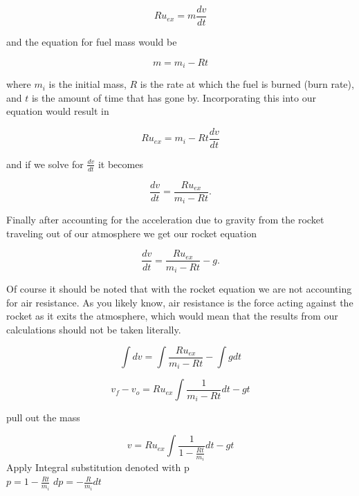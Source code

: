 \documentclass[11pt]{article}
\begin{document}
\begin{equation}
Ru_{ex} = m \frac{dv}{dt}
\end{equation}

\noindent and the equation for fuel mass would be 

\begin{equation}
m = m_i - Rt
\end{equation}

\noindent where $m_i$ is the initial mass, $R$ is the rate at which the fuel is burned (burn rate), and $t$ is the amount of time that has gone by. Incorporating this into our equation would result in

\begin{equation}
Ru_{ex} = m_i - Rt \frac{dv}{dt}
\end{equation}

\noindent and if we solve for $\frac{dv}{dt}$ it becomes

\begin{equation}
\frac{dv}{dt} = \frac{Ru_{ex}}{m_i - Rt}.
\end{equation} 

Finally after accounting for the acceleration due to gravity from the rocket traveling out of our atmosphere we get our rocket equation

\begin{equation}
\frac{dv}{dt} = \frac{Ru_{ex}}{m_i-Rt}-g .
\end{equation}

Of course it should be noted that with the rocket equation we are not accounting for air resistance. As you likely know, air resistance is the force acting against the rocket as it exits the atmosphere, which would mean that the results from our calculations should not be taken literally.

\begin{equation}
\int{dv} = \int{\frac{Ru_{ex}}{m_i-Rt}} - \int{g dt}
\end{equation}

\begin{equation}
v_f-v_o = Ru_{ex}\int{\frac{1}{m_i-Rt}}dt - gt
\end{equation}

pull out the mass

\begin{equation}
v = Ru_{ex}\int{\frac{1}{1-\frac{Rt}{m_i}}}dt - gt
\end{equation}
Apply Integral substitution denoted with p \\
$p = 1-\frac{Rt}{m_i}$
$dp = - \frac{R}{m_i}dt$
\end{document}
